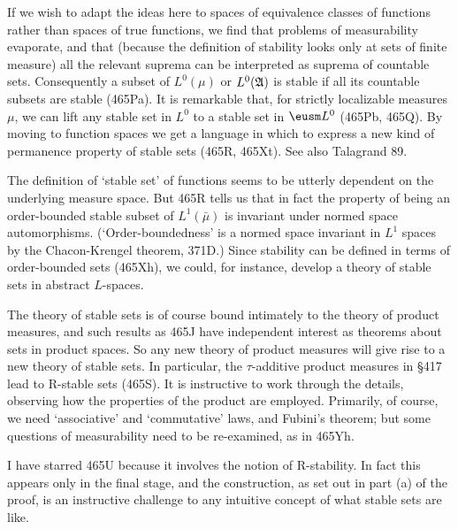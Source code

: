 {If we wish to adapt the ideas here to spaces of equivalence classes of
functions rather than spaces of true functions, we find that problems of
measurability evaporate, and that (because the definition of stability
looks only at sets of finite measure) all the relevant suprema can be
interpreted as suprema of countable sets.   Consequently a subset of
$L^0(\mu)$ or $L^0(\frak A)$ is stable if all its countable subsets are
stable (465Pa).   It is remarkable that, for strictly localizable
measures $\mu$, we can lift any stable set in $L^0$ to a stable set in
$\eusm L^0$ (465Pb, 465Q).   By moving to function spaces we get a
language in which to express a new kind of permanence property of stable
sets (465R, 465Xt).   See also {\smc Talagrand 89}.

The definition of `stable set' of functions seems to be utterly
dependent on the underlying measure space.   But 465R tells us that in
fact the property of being an order-bounded stable subset of
$L^1(\bar\mu)$ is invariant under normed space automorphisms.
(`Order-boundedness' is a normed space invariant in $L^1$ spaces by the
Chacon-Krengel theorem, 371D.)    Since stability can be defined in
terms of order-bounded sets (465Xh), we could, for instance, develop a
theory of stable sets in abstract $L$-spaces.

The theory of stable sets is of course bound intimately to the theory of
product measures, and such results as 465J have independent interest as
theorems about sets in product spaces.   So any new theory of product
measures will give rise to a new theory of stable sets.   In particular,
the $\tau$-additive product measures in \S417 lead to R-stable sets
(465S).   It is instructive to work through the details, observing how
the properties of the product are employed.   Primarily, of course, we
need `associative' and `commutative' laws, and Fubini's theorem;  but
some questions of measurability need to be re-examined, as in 465Yh.

I have starred 465U because it involves the notion of R-stability.   In
fact this appears only in the final stage, and the construction, as set
out in part (a) of the proof, is an instructive challenge to any
intuitive concept of what stable sets are like.
}%

\discrpage


